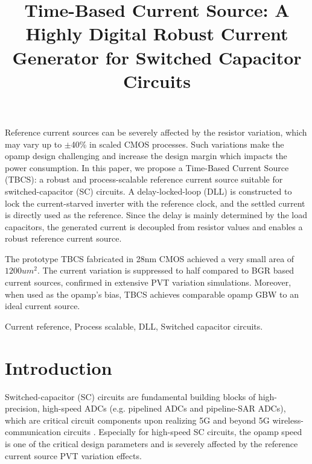 \documentclass[paper]{ieice}
\title{\LARGE \bf
Time-Based Current Source: A Highly Digital Robust Current Generator for Switched Capacitor Circuits
}
\begin{document}
\maketitle
\thispagestyle{empty}
\pagestyle{empty}

\begin{summary}
Reference current sources can be severely affected by the resistor variation, which may vary up to $\pm$40\% in scaled CMOS processes. Such variations make the opamp design challenging and increase the design margin which impacts the power consumption.
In this paper, we propose a Time-Based Current Source (TBCS): a robust and process-scalable reference current source suitable for switched-capacitor (SC) circuits.
A delay-locked-loop (DLL) is constructed to lock the current-starved inverter with the reference clock, and the settled current is directly used as the reference.
Since the delay is mainly determined by the load capacitors, the generated current is decoupled from resistor values and enables a robust reference current source. 

The prototype TBCS fabricated in 28nm CMOS achieved a very small area of $1200um^2$. The current variation is suppressed to half compared to BGR based current sources, confirmed in extensive PVT variation simulations. Moreover, when used as the opamp's bias, TBCS achieves comparable opamp GBW to an ideal current source.

\end{summary}
\begin{keywords}
Current reference, Process scalable, DLL, Switched capacitor circuits.
\end{keywords}

\section{Introduction}

\qquad Switched-capacitor (SC) circuits are fundamental building blocks of high-precision, high-speed ADCs (e.g. pipelined ADCs and pipeline-SAR ADCs), which are critical circuit components upon realizing 5G and beyond 5G wireless-communication circuits \cite{5g1, 5g2, ali201414, ali202012, lagos2018single, hung2020calibration}. Especially for high-speed SC circuits, the opamp speed is one of the critical design parameters and is severely affected by the reference current source PVT variation effects.
\end{document}
